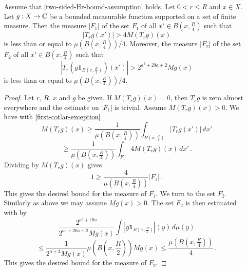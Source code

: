 \begin{lemma}
\label{Cotlar-sets}
\leanok
{}
Assume that \eqref{two-sided-Hr-bound-assumption} holds. Let $0<r\le R$ and  $x\in X$. Let $g:X\to\mathbb{C}$ be a bounded measurable function supported on a set of finite measure.
Then the measure $|F_1|$ of the set $F_1$ of all $x'\in B(x,\frac {R} 4)$ such that
\begin{equation}
\label{first-cotlar-exception}
    |T_rg(x')|> 4 M(T_rg)(x)
\end{equation}
is less than or equal to $\mu(B(x,\frac{R}{4}))/4$.
Moreover,  the measure $|F_2|$ of the set $F_2$ of all $x'\in
B(x,\frac {R} 4)$ such that
\begin{equation}
\label{second-cotlar-exception}
    |T_r(g\mathbf{1}_{B(x,\frac {R} 2)})(x')| > 2^{a^3 + 20a + 2} Mg(x)
\end{equation}
is less than or equal to  $\mu(B(x,\frac{R}{4}))/4$.
\end{lemma}

\begin{proof}
\leanok
Let $r$, $R$, $x$ and $g$ be given.
If $M(T_rg)(x)=0$, then $T_rg$ is zero almost everywhere and the estimate on $|F_1|$ is trivial.
Assume $M(T_rg)(x)>0$.
We have with \eqref{first-cotlar-exception}
\begin{equation}
    M(T_rg)(x)\ge
    \frac 1{\mu(B(x,\frac{R}{4}))}\int_{B(x,\frac{R}{4})}|T_rg(x')|\, dx'
\end{equation}
\begin{equation}
    \ge
    \frac 1{\mu(B(x,\frac{R}{4}))}\int_{F_1} 4 M(T_rg)(x)\, dx' \,.
\end{equation}
Dividing by $M(T_rg)(x)$ gives
\begin{equation}
    1\ge \frac{4}{\mu(B(x,\frac{R}{4}))} |F_1|\, .
\end{equation}
This gives the desired bound for the measure of $F_1$.
We turn to the set $F_2$. Similarly as above we may assume $Mg(x)>0$.
The set $F_2$ is then estimated with  by
\begin{equation}
   \frac {2^{a^3+19a}}{2^{a^3 + 20a + 2}Mg(x)}\int |g\mathbf{1}_{B(x,\frac {R}2)}|(y)\, d\mu(y)
\end{equation}
\begin{equation}
   \le \frac {1}{2^{a+2} Mg(x)}\mu(B(x,\frac {R}{2})) Mg(x) \le \frac{\mu(B(x,\frac {R}{4}))}{4} \,.
\end{equation}
This gives the desired bound for the measure of $F_2$.
\end{proof}


